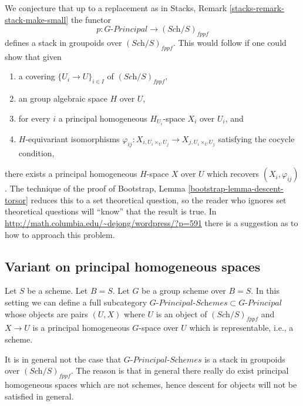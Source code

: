 \begin{remark}
\label{remark-principal-stack-in-groupoids}
We conjecture that up to a replacement as in
Stacks, Remark \ref{stacks-remark-stack-make-small}
the functor
$$
p : G\textit{-Principal} \longrightarrow (\textit{Sch}/S)_{fppf}
$$
defines a stack in groupoids over $(\textit{Sch}/S)_{fppf}$. This would
follow if one could show that given
\begin{enumerate}
\item a covering $\{U_i \to U\}_{i \in I}$ of $(\textit{Sch}/S)_{fppf}$,
\item an group algebraic space $H$ over $U$,
\item for every $i$ a principal homogeneous $H_{U_i}$-space $X_i$
over $U_i$, and
\item $H$-equivariant isomorphisms
$\varphi_{ij} : X_{i, U_i \times_U U_j} \to X_{j, U_i \times_U U_j}$
satisfying the cocycle condition,
\end{enumerate}
there exists a principal homogeneous $H$-space $X$ over $U$
which recovers $(X_i, \varphi_{ij})$. The technique of the proof of
Bootstrap, Lemma \ref{bootstrap-lemma-descent-torsor}
reduces this to a set theoretical question, so the reader who ignores
set theoretical questions will ``know'' that the result is true. In
\url{http://math.columbia.edu/~dejong/wordpress/?p=591}
there is a suggestion as to how to approach this problem.
\end{remark}



\subsection{Variant on principal homogeneous spaces}
\label{subsection-variant-principal-homogeneous-spaces}

\noindent
Let $S$ be a scheme. Let $B = S$.
Let $G$ be a group scheme over $B = S$.
In this setting we can define a full subcategory
$G\textit{-Principal-Schemes} \subset G\textit{-Principal}$
whose objects are pairs $(U, X)$ where $U$ is an object of
$(\textit{Sch}/S)_{fppf}$ and $X \to U$ is a principal homogeneous
$G$-space over $U$ which is representable, i.e., a scheme.

\medskip\noindent
It is in general not the case that $G\textit{-Principal-Schemes}$ is
a stack in groupoids over $(\textit{Sch}/S)_{fppf}$. The reason is
that in general there really do exist principal homogeneous spaces
which are not schemes, hence descent for objects will not be satisfied
in general.



